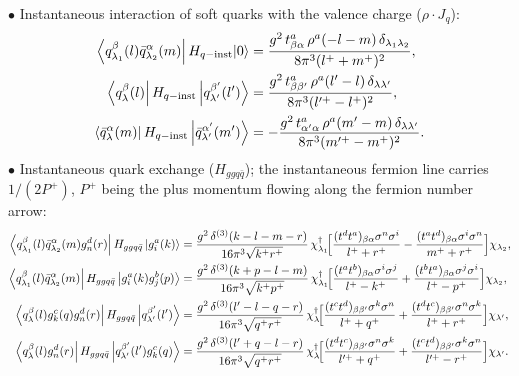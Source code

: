 \noindent$\bullet$ Instantaneous interaction of soft quarks with the valence charge ($\rho\cdot J_{q}$):
{\small\begin{align}
\left\langle q^{\beta}_{\lambda_{1}}(l)\bar q^{\alpha}_{\lambda_{2}}(m)\right|H_{q-{\rm inst}}|0\rangle&=
\frac{g^{2}\,t^{a}_{\beta\alpha}\,\rho^{a}(-l-m)\,\delta_{\lambda_{1}\lambda_{2}}}{8\pi^{3}(l^{+}+m^{+})^{2}},
\label{eq:MEinst}\\
\left\langle q^{\beta}_{\lambda}(l)\right|H_{q-{\rm inst}}\left|q^{\beta'}_{\lambda'}(l')\right\rangle&=
\frac{g^{2}\,t^{a}_{\beta\beta'}\,\rho^{a}(l'-l)\,\delta_{\lambda\lambda'}}{8\pi^{3}(l'^{+}-l^{+})^{2}},
\label{eq:MEinstq}\\
\left\langle\bar q^{\alpha}_{\lambda}(m)\right|H_{q-{\rm inst}}\left|\bar q^{\alpha'}_{\lambda'}(m')\right\rangle&=
-\frac{g^{2}\,t^{a}_{\alpha'\alpha}\,\rho^{a}(m'-m)\,\delta_{\lambda\lambda'}}{8\pi^{3}(m'^{+}-m^{+})^{2}}.
\label{eq:MEinstqb}
\end{align}}
$\bullet$ Instantaneous quark exchange ($H_{ggq\bar q}$); the instantaneous fermion line carries
$1/(2P^{+})$, $P^{+}$ being the plus momentum flowing along the fermion number arrow:
{\small\begin{align}
\left\langle q^{\beta}_{\lambda_{1}}(l)\bar q^{\alpha}_{\lambda_{2}}(m)g^{d}_{n}(r)\right|H_{ggq\bar q}\left|g^{a}_{i}(k)\right\rangle&=
\frac{g^{2}\,\delta^{(3)}(k-l-m-r)}{16\pi^{3}\sqrt{k^{+}r^{+}}}\,
\chi^{\dagger}_{\lambda_{1}}\!\Big[\frac{(t^{d}t^{a})_{\beta\alpha}\sigma^{n}\sigma^{i}}{l^{+}+r^{+}}
-\frac{(t^{a}t^{d})_{\beta\alpha}\sigma^{i}\sigma^{n}}{m^{+}+r^{+}}\Big]\chi_{\lambda_{2}},
\label{eq:MEggqq1}\\
\left\langle q^{\beta}_{\lambda_{1}}(l)\bar q^{\alpha}_{\lambda_{2}}(m)\right|H_{ggq\bar q}\left|g^{a}_{i}(k)g^{b}_{j}(p)\right\rangle&=
\frac{g^{2}\,\delta^{(3)}(k+p-l-m)}{16\pi^{3}\sqrt{k^{+}p^{+}}}\,
\chi^{\dagger}_{\lambda_{1}}\!\Big[\frac{(t^{a}t^{b})_{\beta\alpha}\sigma^{i}\sigma^{j}}{l^{+}-k^{+}}
+\frac{(t^{b}t^{a})_{\beta\alpha}\sigma^{j}\sigma^{i}}{l^{+}-p^{+}}\Big]\chi_{\lambda_{2}},
\label{eq:MEggqq2}\\
\left\langle q^{\beta}_{\lambda}(l)g^{c}_{k}(q)g^{d}_{n}(r)\right|H_{ggq\bar q}\left|q^{\beta'}_{\lambda'}(l')\right\rangle&=
\frac{g^{2}\,\delta^{(3)}(l'-l-q-r)}{16\pi^{3}\sqrt{q^{+}r^{+}}}\,
\chi^{\dagger}_{\lambda}\!\Big[\frac{(t^{c}t^{d})_{\beta\beta'}\sigma^{k}\sigma^{n}}{l^{+}+q^{+}}
+\frac{(t^{d}t^{c})_{\beta\beta'}\sigma^{n}\sigma^{k}}{l^{+}+r^{+}}\Big]\chi_{\lambda'},
\label{eq:MEq2g}\\
\left\langle q^{\beta}_{\lambda}(l)g^{d}_{n}(r)\right|H_{ggq\bar q}\left|q^{\beta'}_{\lambda'}(l')g^{c}_{k}(q)\right\rangle&=
\frac{g^{2}\,\delta^{(3)}(l'+q-l-r)}{16\pi^{3}\sqrt{q^{+}r^{+}}}\,
\chi^{\dagger}_{\lambda}\!\Big[\frac{(t^{d}t^{c})_{\beta\beta'}\sigma^{n}\sigma^{k}}{l'^{+}+q^{+}}
+\frac{(t^{c}t^{d})_{\beta\beta'}\sigma^{k}\sigma^{n}}{l'^{+}-r^{+}}\Big]\chi_{\lambda'}.
\label{eq:MEqginst}
\end{align}}

